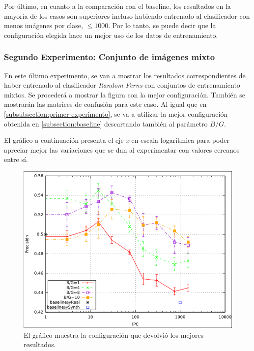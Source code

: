 	Por último, en cuanto a la comparación con el baseline, los resultados en la mayoría de los casos son superiores incluso habiendo entrenado al clasificador con menos imágenes por clase, $\leq 1000$. Por lo tanto, se puede decir que la configuración elegida hace un mejor uso de los datos de entrenamiento.
	
\subsubsection{Segundo Experimento: Conjunto de imágenes mixto}
	
	En este último experimento, se van a mostrar los resultados correspondientes de haber entrenado al clasificador \textit{Random Ferns} con conjuntos de entrenamiento mixtos. Se procederá a mostrar la figura con la mejor configuración. También se mostrarán las matrices de confusión para este caso. Al igual que en \ref{subsubsection:primer-experimento}, se va a utilizar la mejor configuración obtenida en \ref{subsection:baseline} descartando también al parámetro $B/G$.

	El gráfico a continuación presenta el eje \textit{x} en escala logarítmica para poder apreciar mejor las variaciones que se dan al experimentar con valores cercanos entre sí.

			\begin{figure}[!htbp]
				\centering
				\centerline{
					\includegraphics[scale=0.6]{img/resultados/mixtas/best_mean_2040.png}
				}
				\caption[Mixtas media mejor resultado]{El gráfico muestra la configuración que devolvió los mejores resultados.}
				\label{fig: Mixtas-media-mejor}
			\end{figure}

